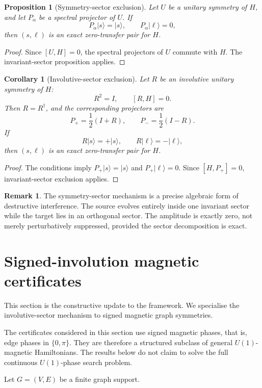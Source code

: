 \documentclass[11pt]{article}
\newtheorem{proposition}[theorem]{Proposition}
\newtheorem{corollary}[theorem]{Corollary}
\theoremstyle{definition}
\newtheorem{remark}[theorem]{Remark}
\begin{document}
\begin{proposition}[Symmetry-sector exclusion]
Let $U$ be a unitary symmetry of $H$, and let $P_\alpha$ be a spectral projector of $U$. If
\[
P_\alpha|s\rangle=|s\rangle,\qquad P_\alpha|\ell\rangle=0,
\]
then $(s,\ell)$ is an exact zero-transfer pair for $H$.
\end{proposition}

\begin{proof}
Since $[U,H]=0$, the spectral projectors of $U$ commute with $H$. The invariant-sector proposition applies.
\end{proof}

\begin{corollary}[Involutive-sector exclusion]
Let $R$ be an involutive unitary symmetry of $H$:
\[
R^2=I,
\qquad [R,H]=0.
\]
Then $R=R^\dagger$, and the corresponding projectors are
\[
P_+=\frac12(I+R),\qquad P_-=\frac12(I-R).
\]
If
\[
R|s\rangle=+|s\rangle,
\qquad R|\ell\rangle=-|\ell\rangle,
\]
then $(s,\ell)$ is an exact zero-transfer pair for $H$.
\end{corollary}

\begin{proof}
The conditions imply $P_+|s\rangle=|s\rangle$ and $P_+|\ell\rangle=0$. Since $[H,P_+]=0$, invariant-sector exclusion applies.
\end{proof}

\begin{remark}
The symmetry-sector mechanism is a precise algebraic form of destructive interference. The source evolves entirely inside one invariant sector while the target lies in an orthogonal sector. The amplitude is exactly zero, not merely perturbatively suppressed, provided the sector decomposition is exact.
\end{remark}

\section{Signed-involution magnetic certificates}
This section is the constructive update to the framework. We specialise the involutive-sector mechanism to signed magnetic graph symmetries.

The certificates considered in this section use signed magnetic phases, that is, edge phases in $\{0,\pi\}$. They are therefore a structured subclass of general $U(1)$-magnetic Hamiltonians. The results below do not claim to solve the full continuous $U(1)$-phase search problem.

Let $G=(V,E)$ be a finite graph support.
\end{document}
